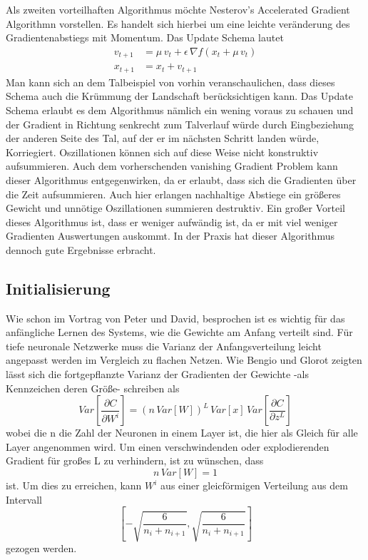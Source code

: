 \documentclass[12pt]{article}
\newcommand{\partderv}[2]{\frac{\partial{#1}}{\partial{#2}}}
\begin{document}
Als zweiten vorteilhaften Algorithmus möchte Nesterov's Accelerated Gradient Algorithmn vorstellen. Es handelt sich hierbei um eine leichte veränderung des Gradientenabstiegs mit Momentum. Das Update Schema lautet
\begin{align*}
    v_{t+1}&=\mu\,v_t+\epsilon\,\nabla{f}(x_t+\mu\,v_t)\\
    x_{t+1}&=x_t+v_{t+1}
\end{align*}
Man kann sich an dem Talbeispiel von vorhin veranschaulichen, dass dieses Schema auch die Krümmung der Landschaft berücksichtigen kann. Das Update Schema erlaubt es dem Algorithmus nämlich ein wening voraus zu schauen und der Gradient in Richtung senkrecht zum Talverlauf würde durch Eingbeziehung der anderen Seite des Tal, auf der er im nächsten Schritt landen würde, Korriegiert. Oszillationen können sich auf diese Weise nicht konstruktiv aufsummieren. Auch dem vorherschenden vanishing Gradient Problem kann dieser Algorithmus entgegenwirken, da er erlaubt, dass sich die Gradienten über die Zeit aufsummieren. Auch hier erlangen nachhaltige Abstiege ein größeres Gewicht und unnötige Oszillationen summieren destruktiv. Ein großer Vorteil dieses Algorithmus ist, dass er weniger aufwändig ist, da er mit viel weniger Gradienten Auswertungen auskommt. In der Praxis hat dieser Algorithmus dennoch gute Ergebnisse erbracht.


\subsection*{Initialisierung}
Wie schon im Vortrag von Peter und David, besprochen ist es wichtig für das anfängliche Lernen des Systems, wie die Gewichte am Anfang verteilt sind. Für tiefe neuronale Netzwerke muss die Varianz der Anfangsverteilung leicht angepasst werden im Vergleich zu flachen Netzen. Wie Bengio und Glorot zeigten lässt sich die fortgepflanzte Varianz der Gradienten der Gewichte -als Kennzeichen deren Größe- schreiben als
$$Var[\partderv{C}{W^i}]=(n\,Var[W])^L\,Var[x]\,Var[\partderv{C}{z^L}]$$
wobei die n die Zahl der Neuronen in einem Layer ist, die hier als Gleich für alle Layer angenommen wird. Um einen verschwindenden oder explodierenden Gradient für großes L zu verhindern, ist zu wünschen, dass
$$n\,Var[W]=1$$
ist. Um dies zu erreichen, kann $W^i$ aus einer gleicförmigen Verteilung aus dem Intervall 
$$\left[-\sqrt{\frac{6}{n_i+n_{i+1}}},\sqrt{\frac{6}{n_i+n_{i+1}}}\right]$$
gezogen werden.
\end{document}
